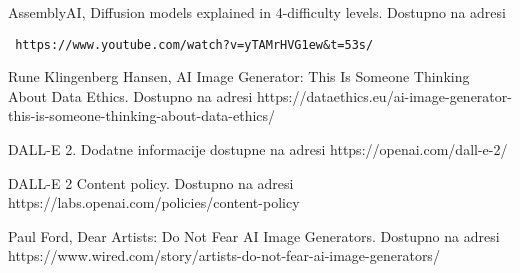 \documentclass[12pt, letterpaper]{article}
\begin{document}
\begin{thebibliography}{10}
\begin{verbatim}
\end{verbatim}

 AssemblyAI, Diffusion models explained in 4-difficulty levels. Dostupno na adresi\begin{verbatim} https://www.youtube.com/watch?v=yTAMrHVG1ew&t=53s/
\end{verbatim}

 Rune Klingenberg Hansen, AI Image Generator: This Is Someone Thinking About Data Ethics. Dostupno na adresi https://dataethics.eu/ai-image-generator-this-is-someone-thinking-about-data-ethics/

 DALL-E 2. Dodatne informacije dostupne na adresi https://openai.com/dall-e-2/

 DALL-E 2 Content policy. Dostupno na adresi https://labs.openai.com/policies/content-policy

 Paul Ford, Dear Artists: Do Not Fear AI Image Generators. Dostupno na adresi https://www.wired.com/story/artists-do-not-fear-ai-image-generators/

\end{thebibliography}
\end{document}
